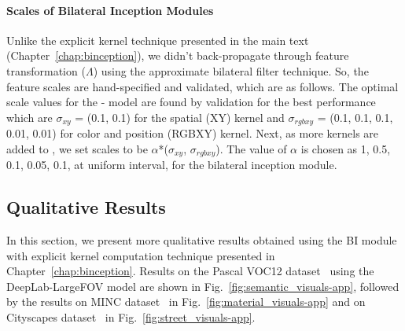 \paragraph{Scales of Bilateral Inception Modules}
\label{sec:scales}

Unlike the explicit kernel technique presented in the main text (Chapter~\ref{chap:binception}),
we didn't back-propagate through feature transformation ($\Lambda$)
using the approximate bilateral filter technique.
So, the feature scales are hand-specified and validated, which are as follows.
The optimal scale values for the - model are found by validation for the best performance which are
$\sigma_{xy}$ = (0.1, 0.1) for the spatial (XY) kernel and $\sigma_{rgbxy}$ = (0.1, 0.1, 0.1, 0.01, 0.01) for color and position (RGBXY)  kernel.
Next, as more kernels are added to , we set scales to be $\alpha$*($\sigma_{xy}$, $\sigma_{rgbxy}$).
The value of $\alpha$ is chosen as  1, 0.5, 0.1, 0.05, 0.1, at uniform interval, for the  bilateral inception module.


\subsection{Qualitative Results}
\label{sec:qualitative-app}

In this section, we present more qualitative results obtained using the BI module with explicit
kernel computation technique presented in Chapter~\ref{chap:binception}. Results on the Pascal VOC12
dataset~\cite{voc2012segmentation} using the DeepLab-LargeFOV model are shown in Fig.~\ref{fig:semantic_visuals-app},
followed by the results on MINC dataset~\cite{bell2015minc}
in Fig.~\ref{fig:material_visuals-app} and on
Cityscapes dataset~\cite{Cordts2015Cvprw} in Fig.~\ref{fig:street_visuals-app}.



